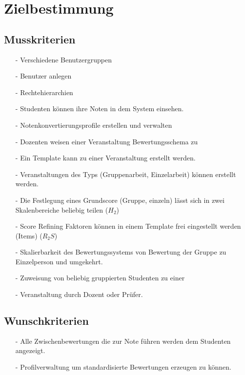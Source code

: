 


	
	\tableofcontents
	\newpage

	\section{Zielbestimmung}
		\subsection{Musskriterien}
			\begin{itemize}
			\item[-]	Verschiedene Benutzergruppen 
			\item[-]	Benutzer anlegen
			\item[-]	Rechtehierarchien
			\item[-]	Studenten können ihre Noten in dem System einsehen.
			\item[-]	Notenkonvertierungsprofile erstellen und verwalten
			\item[-]	Dozenten weisen einer Veranstaltung Bewertungsschema zu
			\item[-]	Ein Template kann zu einer Veranstaltung erstellt werden.
			\item[-]	Veranstaltungen des Typs (Gruppenarbeit, Einzelarbeit) können erstellt werden.
			\item[-]	Die Festlegung eines Grundscore (Gruppe, einzeln) lässt sich in zwei Skalenbereiche beliebig teilen ($H_2$)
			\item[-]	Score Refining Faktoren können in einem Template frei eingestellt werden (Items) ($R_2S$)
			\item[-]	Skalierbarkeit des Bewertungssystems von Bewertung der Gruppe zu Einzelperson und umgekehrt.
			\item[-]	Zuweisung von beliebig gruppierten Studenten zu einer \item[-]	Veranstaltung durch Dozent oder Prüfer.				
			\end{itemize}

			
		\subsection{Wunschkriterien}
		\begin{itemize}
		\item[-]	Alle Zwischenbewertungen die zur Note führen werden dem Studenten angezeigt.
		\item[-]	Profilverwaltung um standardisierte Bewertungen erzeugen zu können.
		\end{itemize}
		
